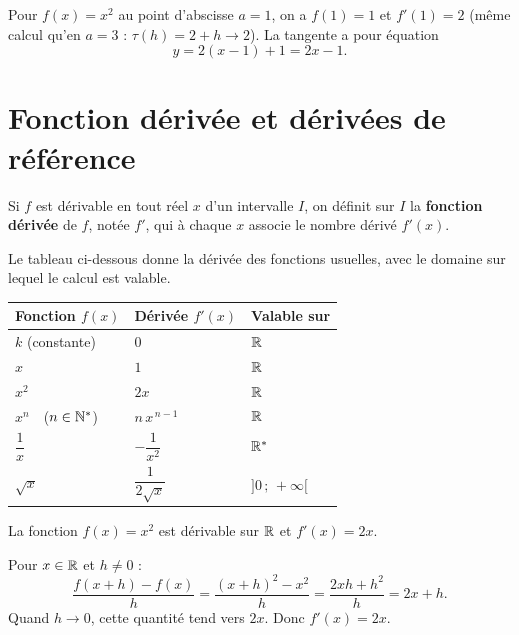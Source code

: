 \begin{exemple}
Pour $f(x)=x^2$ au point d'abscisse $a=1$, on a $f(1)=1$ et $f'(1)=2$ (même calcul
qu'en $a=3$ : $\tau(h)=2+h\to 2$). La tangente a pour équation
\[ y=2(x-1)+1=2x-1. \]
\end{exemple}

\section{Fonction dérivée et dérivées de référence}

\begin{definition}
Si $f$ est dérivable en tout réel $x$ d'un intervalle $I$, on définit sur $I$ la
\textbf{fonction dérivée} de $f$, notée $f'$, qui à chaque $x$ associe le nombre
dérivé $f'(x)$.
\end{definition}

\begin{propriete}
Le tableau ci-dessous donne la dérivée des fonctions usuelles, avec le domaine sur
lequel le calcul est valable.
\begin{center}\renewcommand{\arraystretch}{1.5}
\begin{tabular}{@{}l l l@{}}
\toprule
\textbf{Fonction $f(x)$} & \textbf{Dérivée $f'(x)$} & \textbf{Valable sur} \\
\midrule
$k$ (constante)        & $0$                       & $\mathbb{R}$ \\
$x$                    & $1$                       & $\mathbb{R}$ \\
$x^2$                  & $2x$                      & $\mathbb{R}$ \\
$x^n$\ \ ($n\in\mathbb{N}^*$)  & $n\,x^{\,n-1}$            & $\mathbb{R}$ \\
$\dfrac{1}{x}$         & $-\dfrac{1}{x^2}$         & $\mathbb{R}^*$ \\
$\sqrt{x}$             & $\dfrac{1}{2\sqrt{x}}$    & $]0\,;\,+\infty[$ \\
\bottomrule
\end{tabular}
\end{center}
\end{propriete}

\begin{theoreme}
La fonction $f(x)=x^2$ est dérivable sur $\mathbb{R}$ et $f'(x)=2x$.
\end{theoreme}

\begin{exemple}[Preuve]
Pour $x\in\mathbb{R}$ et $h\neq 0$ :
\[ \frac{f(x+h)-f(x)}{h}=\frac{(x+h)^2-x^2}{h}=\frac{2xh+h^2}{h}=2x+h. \]
Quand $h\to 0$, cette quantité tend vers $2x$. Donc $f'(x)=2x$.
\end{exemple}


